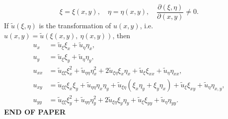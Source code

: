 \documentclass[11pt,a4paper]{article}
\begin{document}
	$$
	\xi = \xi(x, y),\quad \eta = \eta(x, y),\quad \frac{\partial(\xi, \eta)}{\partial(x,y)}\neq 0.
	$$
	If $\tilde{u}(\xi, \eta)$ is the transformation of $u(x, y)$, i.e. $u(x, y) = \tilde{u}(\xi(x, y),\ \eta(x, y))$, then
	\begin{align*}
		u_x &= \tilde{u}_\xi\xi_x + \tilde{u}_\eta\eta_x,\\
		u_y &= \tilde{u}_\xi\xi_y + \tilde{u}_\eta\eta_y,\\
		u_{xx} & =\tilde{u}_{\xi\xi}\xi^2_x + \tilde{u}_{\eta\eta}\eta_x^2 + 2\tilde{u}_{\xi\eta}\xi_x\eta_x + \tilde{u}_\xi\xi_{xx} + \tilde{u}_\eta\eta_{xx},\\
		u_{xy} &= \tilde{u}_{\xi\xi}\xi_x\xi_y + \tilde{u}_{\eta\eta}\eta_x\eta_y + \tilde{u}_{\xi\eta}(\xi_x\eta_y + \xi_y\eta_x) + \tilde{u}_\xi\xi_{xy} + \tilde{u}_\eta\eta_{x,y},\\
		u_{yy} & =\tilde{u}_{\xi\xi}\xi^2_y + \tilde{u}_{\eta\eta}\eta_y^2 + 2\tilde{u}_{\xi\eta}\xi_y\eta_y + \tilde{u}_\xi\xi_{yy} + \tilde{u}_\eta\eta_{yy}.
	\end{align*}
	\vfill\centering\textbf{END OF PAPER}
\end{document}
